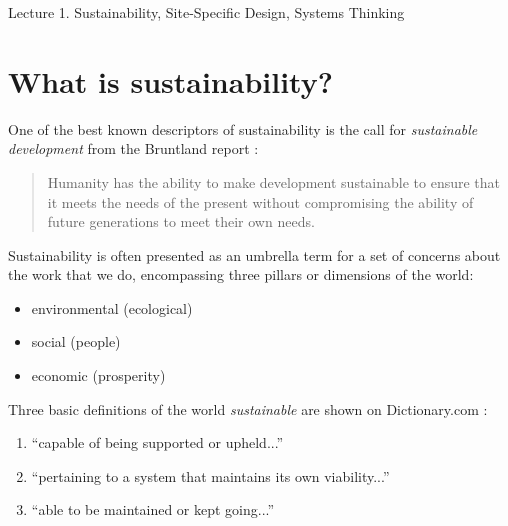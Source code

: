 \documentclass[10pt]{article}
\begin{document}
   \noindent
   \begin{center}

   \hrulefill
   
   \vspace{5pt}
   
   \vspace{0pt}
   
   {\Large \hfill  Lecture 1. Sustainability, Site-Specific Design, Systems Thinking}
   \vspace{5pt}
   
  
   \hrulefill
   \end{center}

{}

\section{What is sustainability?}

 One of the best known descriptors of sustainability is the call for \textit{sustainable development} from the Bruntland report \cite{bruntland}:
 
 \begin{quote}
 Humanity has the ability to make development sustainable to ensure that it meets the needs of the present without compromising the ability of future generations to meet their own needs.
 \end{quote}
 
 Sustainability is often presented as an umbrella term for a set of concerns about the work that we do, encompassing three pillars or dimensions of the world:
 
\begin{itemize}
\item environmental (ecological)
\item social (people)
\item economic (prosperity)
\end{itemize}

Three basic definitions of the world \textit{sustainable} are shown on Dictionary.com \cite{noauthor_undated-fd}:

\begin{enumerate}
\item ``capable of being supported or upheld...''
\item ``pertaining to a system that maintains its own viability...''
\item ``able to be maintained or kept going...''
\end{enumerate}
\end{document}
